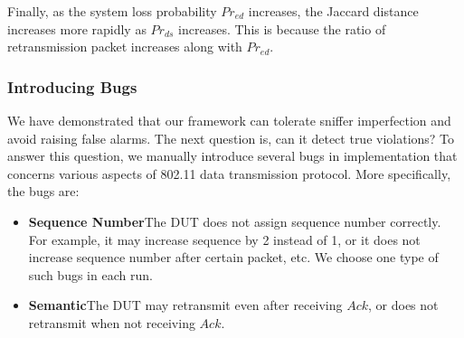 Finally, as the system loss probability $Pr_{ed}$ increases, the Jaccard
distance increases more rapidly as $Pr_{ds}$ increases.  This is because the
ratio of retransmission packet increases along with $Pr_{ed}$.

\vspace*{-3mm}
\subsubsection{Introducing Bugs}

We have demonstrated that our framework can tolerate sniffer imperfection and
avoid raising false alarms.  The next question is, can it detect true
violations?  To answer this question, we manually introduce several bugs in
\ns{} implementation that concerns various aspects of 802.11 data transmission
protocol.  More specifically, the bugs are:

\begin{itemize}
  \item \textbf{Sequence Number}\quad The DUT does not assign sequence number
    correctly. For example, it may increase sequence by 2 instead of 1, or it
    does not increase sequence number after certain packet, etc. We choose one
    type of such bugs in each run.
  \item \textbf{Semantic}\quad The DUT may retransmit even
    after receiving $Ack$, or does not retransmit when not receiving $Ack$.
\end{itemize}

